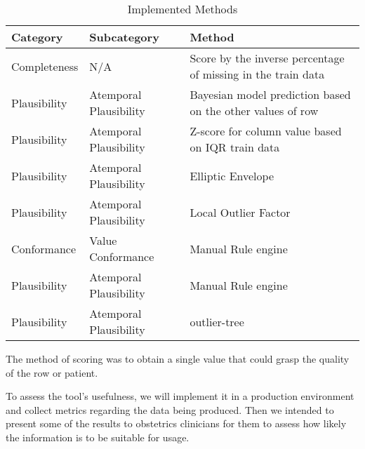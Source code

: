 \begin{table}[htpb]
\caption{Implemented Methods} \label{tab:methods}
\renewcommand{\arraystretch}{1.4}
\setlength{\tabcolsep}{10pt}

\begin{tabularx}{\textwidth}{ p{2cm} p{3.5cm} X }
\hline
 Category   & Subcategory           & Method   \\ \hline
Completeness     & N/A               & Score by the inverse percentage of missing in the train data         \\ 
Plausibility & Atemporal Plausibility & Bayesian model prediction based on the other values of row \\ 
Plausibility & Atemporal Plausibility         & Z-score for column value based on IQR train data       \\    
Plausibility & Atemporal Plausibility           & Elliptic Envelope                       \\ 
Plausibility & Atemporal Plausibility           & Local Outlier Factor                \\ 
Conformance & Value Conformance           & Manual Rule engine                           \\ 
Plausibility & Atemporal Plausibility           & Manual Rule engine                      \\ 
Plausibility & Atemporal Plausibility           & outlier-tree                      \\ 
\hline
\end{tabularx}

\end{table}
The method of scoring was to obtain a single value that could grasp the quality of the row or patient.

To assess the tool's usefulness, we will implement it in a production environment and collect metrics regarding the data being produced. Then we intended to present some of the results to obstetrics clinicians for them to assess how likely the information is to be suitable for usage.

